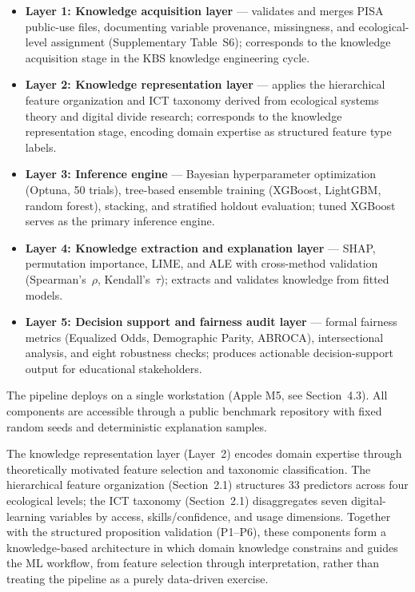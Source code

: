 \documentclass[review,12pt]{elsarticle}
\begin{document}
\begin{itemize}
\item \textbf{Layer 1: Knowledge acquisition layer} --- validates and merges PISA public-use files, documenting variable provenance, missingness, and ecological-level assignment (Supplementary Table~S6); corresponds to the knowledge acquisition stage in the KBS knowledge engineering cycle.
\item \textbf{Layer 2: Knowledge representation layer} --- applies the hierarchical feature organization and ICT taxonomy derived from ecological systems theory and digital divide research; corresponds to the knowledge representation stage, encoding domain expertise as structured feature type labels.
\item \textbf{Layer 3: Inference engine} --- Bayesian hyperparameter optimization (Optuna, 50 trials), tree-based ensemble training (XGBoost, LightGBM, random forest), stacking, and stratified holdout evaluation; tuned XGBoost serves as the primary inference engine.
\item \textbf{Layer 4: Knowledge extraction and explanation layer} --- SHAP, permutation importance, LIME, and ALE with cross-method validation (Spearman's~$\rho$, Kendall's~$\tau$); extracts and validates knowledge from fitted models.
\item \textbf{Layer 5: Decision support and fairness audit layer} --- formal fairness metrics (Equalized Odds, Demographic Parity, ABROCA), intersectional analysis, and eight robustness checks; produces actionable decision-support output for educational stakeholders.
\end{itemize}

The pipeline deploys on a single workstation (Apple M5, see Section~4.3). All components are accessible through a public benchmark repository with fixed random seeds and deterministic explanation samples.

The knowledge representation layer (Layer~2) encodes domain expertise through theoretically motivated feature selection and taxonomic classification. The hierarchical feature organization (Section~2.1) structures 33 predictors across four ecological levels; the ICT taxonomy (Section~2.1) disaggregates seven digital-learning variables by access, skills/confidence, and usage dimensions. Together with the structured proposition validation (P1--P6), these components form a knowledge-based architecture in which domain knowledge constrains and guides the ML workflow, from feature selection through interpretation, rather than treating the pipeline as a purely data-driven exercise.
\end{document}

